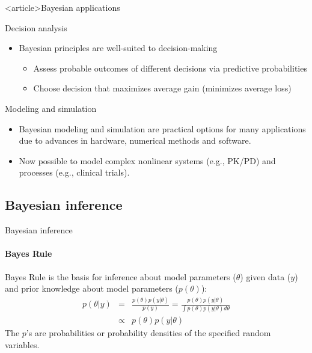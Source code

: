 \documentclass{beamer}
\begin{document}


\begin{frame}<article>{Bayesian applications}

\begin{block}{Decision analysis}
\begin{itemize}
\item Bayesian principles are well-suited to decision-making
\begin{itemize}
\item  Assess probable outcomes of different decisions via predictive probabilities
\item Choose decision that maximizes average gain (minimizes average loss) 
\end{itemize}
\end{itemize}
\end{block}

\begin{block}{Modeling and simulation}
\begin{itemize}
\item  Bayesian modeling and simulation are practical options for many applications due to advances in hardware, numerical methods and software.
\item Now possible to model complex nonlinear systems (e.g., PK/PD) and processes (e.g., clinical trials).
\end{itemize}
\end{block}

\end{frame}

\subsection{Bayesian inference}

\begin{frame}{Bayesian inference}
\framesubtitle{\large Bayes Rule}

\alert{Bayes Rule} is the basis for inference about model parameters ($\theta$) given data ($y$) and prior knowledge about model parameters ($p\left(\theta\right)$):
\begin{eqnarray*}
p\left(\theta|y\right) &=& \frac{p\left(\theta\right)p\left(y|\theta\right)}{p\left(y\right)}
= \frac{p\left(\theta\right)p\left(y|\theta\right)}{\int{p\left(\theta\right)p\left(y|\theta\right) d\theta}}
\\ 
&\propto& p\left(\theta\right)p\left(y|\theta\right)
\end{eqnarray*}
The $p$'s are probabilities or probability densities of the specified random variables.

\end{frame}
\end{document}
